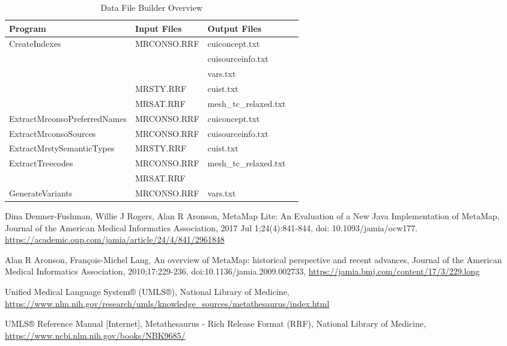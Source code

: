 \documentclass[letterpaper,article]{memoir}
\def\strut{{\rule{0cm}{0.5cm}}}
\def\tt{\ttfamily}
\def\bf{\bfseries}
\def\SLBF{\strut\Large\bf}
\def\LBF{\Large\bf}
\begin{document}
\begin{table*}
\footnotesize
\begin{tabular}{|l|l|l|p{1.7in}|} \hline
\SLBF Program   & \LBF Input Files  & \LBF Output Files \\
 \hline
 \tt CreateIndexes & MRCONSO.RRF &  cuiconcept.txt \\
 &           & cuisourceinfo.txt \\
  &           & vars.txt \\
 & MRSTY.RRF & cuist.txt \\
 & MRSAT.RRF & mesh\_tc\_relaxed.txt \\
 \hline
 \tt ExtractMrconsoPreferredNames &  MRCONSO.RRF & cuiconcept.txt  \\
 \hline
 \tt ExtractMrconsoSources &  MRCONSO.RRF & cuisourceinfo.txt \\
 \hline
 \tt ExtractMrstySemanticTypes &  MRSTY.RRF & cuist.txt \\
 \hline
 \tt ExtractTreecodes & MRCONSO.RRF & mesh\_tc\_relaxed.txt \\
                      & MRSAT.RRF &  \\
 \hline
 \tt GenerateVariants & MRCONSO.RRF  & vars.txt \\ \hline
\end{tabular}
\caption{Data File Builder Overview}
\label{tab:dfb_overview}
\end{table*}


\begin{thebibliography}{99}
 Dina Demner-Fushman, Willie J Rogers, Alan
  R Aronson, MetaMap Lite: An Evaluation of a New Java Implementation
  of MetaMap, Journal of the American Medical Informatics Association,
  2017 Jul 1;24(4):841-844, doi: 10.1093/jamia/ocw177.
  \url{https://academic.oup.com/jamia/article/24/4/841/2961848}
  
 Alan R Aronson, François-Michel Lang,
An overview of MetaMap: historical perspective and recent advances,
Journal of the American Medical Informatics Association, 2010;17:229-236, doi:10.1136/jamia.2009.002733,
\url{https://jamia.bmj.com/content/17/3/229.long}

 Unified Medical Language System® (UMLS®), National Library of Medicine,
\url{https://www.nlm.nih.gov/research/umls/knowledge_sources/metathesaurus/index.html}

 UMLS® Reference Manual [Internet], Metathesaurus
  - Rich Release Format (RRF), National Library of Medicine,
  \url{https://www.ncbi.nlm.nih.gov/books/NBK9685/}
\end{thebibliography}
\end{document}
